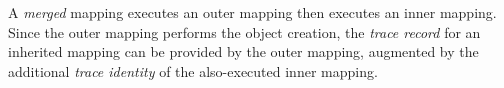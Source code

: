 \documentclass[runningheads,a4paper]{llncs}
\begin{document}
A \emph{merged} mapping executes an outer mapping then executes an inner mapping. Since the outer mapping performs the object creation, the \emph{trace record} for an inherited mapping can be provided by the outer mapping, augmented by the additional  \emph{trace identity} of the also-executed inner mapping.










\end{document}
